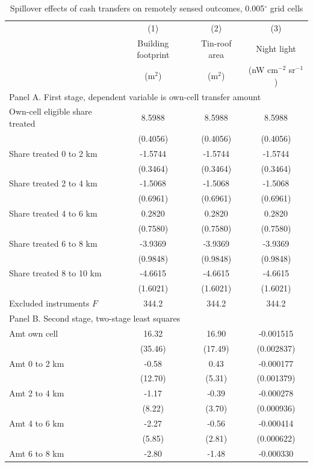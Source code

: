\begin{table}[htbp]
\centering
\caption{Spillover effects of cash transfers on remotely sensed outcomes, 0.005$^\circ$ grid cells}
\label{tab:eq2-spillovers}
\begin{tabular}{lccc}
\hline\hline
 & (1) & (2) & (3) \\
 & Building footprint & Tin-roof area & Night light \\
 & (m$^2$) & (m$^2$) & (nW cm$^{-2}$ sr$^{-1}$) \\
\hline
\multicolumn{4}{l}{Panel A. First stage, dependent variable is own-cell transfer amount} \\
Own-cell eligible share treated & 8.5988 & 8.5988 & 8.5988 \\
 & (0.4056) & (0.4056) & (0.4056) \\
Share treated 0 to 2 km & -1.5744 & -1.5744 & -1.5744 \\
 & (0.3464) & (0.3464) & (0.3464) \\
Share treated 2 to 4 km & -1.5068 & -1.5068 & -1.5068 \\
 & (0.6961) & (0.6961) & (0.6961) \\
Share treated 4 to 6 km & 0.2820 & 0.2820 & 0.2820 \\
 & (0.7580) & (0.7580) & (0.7580) \\
Share treated 6 to 8 km & -3.9369 & -3.9369 & -3.9369 \\
 & (0.9848) & (0.9848) & (0.9848) \\
Share treated 8 to 10 km & -4.6615 & -4.6615 & -4.6615 \\
 & (1.6021) & (1.6021) & (1.6021) \\
Excluded instruments $F$ & 344.2 & 344.2 & 344.2 \\
\hline
\multicolumn{4}{l}{Panel B. Second stage, two-stage least squares} \\
Amt own cell & 16.32 & 16.90 & -0.001515 \\
 & (35.46) & (17.49) & (0.002837) \\
Amt 0 to 2 km & -0.58 & 0.43 & -0.000177 \\
 & (12.70) & (5.31) & (0.001379) \\
Amt 2 to 4 km & -1.17 & -0.39 & -0.000278 \\
 & (8.22) & (3.70) & (0.000936) \\
Amt 4 to 6 km & -2.27 & -0.56 & -0.000414 \\
 & (5.85) & (2.81) & (0.000622) \\
Amt 6 to 8 km & -2.80 & -1.48 & -0.000330 \\

\end{tabular}
\end{table}
